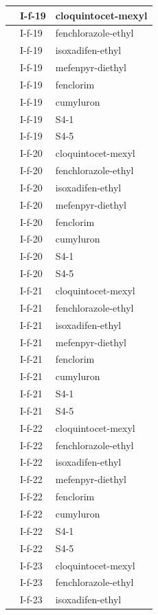\documentclass[11pt,a4paper]{article}
\begin{document}
\begin{table}[h]
\begin{tabular}{|l|l|l|}
 & I-f-19 & cloquintocet-mexyl \\ \hline
 & I-f-19 & fenchlorazole-ethyl \\ \hline
 & I-f-19 & isoxadifen-ethyl \\ \hline
 & I-f-19 & mefenpyr-diethyl \\ \hline
 & I-f-19 & fenclorim \\ \hline
 & I-f-19 & cumyluron \\ \hline
 & I-f-19 & S4-1 \\ \hline
 & I-f-19 & S4-5 \\ \hline
 & I-f-20 & cloquintocet-mexyl \\ \hline
 & I-f-20 & fenchlorazole-ethyl \\ \hline
 & I-f-20 & isoxadifen-ethyl \\ \hline
 & I-f-20 & mefenpyr-diethyl \\ \hline
 & I-f-20 & fenclorim \\ \hline
 & I-f-20 & cumyluron \\ \hline
 & I-f-20 & S4-1 \\ \hline
 & I-f-20 & S4-5 \\ \hline
 & I-f-21 & cloquintocet-mexyl \\ \hline
 & I-f-21 & fenchlorazole-ethyl \\ \hline
 & I-f-21 & isoxadifen-ethyl \\ \hline
 & I-f-21 & mefenpyr-diethyl \\ \hline
 & I-f-21 & fenclorim \\ \hline
 & I-f-21 & cumyluron \\ \hline
 & I-f-21 & S4-1 \\ \hline
 & I-f-21 & S4-5 \\ \hline
 & I-f-22 & cloquintocet-mexyl \\ \hline
 & I-f-22 & fenchlorazole-ethyl \\ \hline
 & I-f-22 & isoxadifen-ethyl \\ \hline
 & I-f-22 & mefenpyr-diethyl \\ \hline
 & I-f-22 & fenclorim \\ \hline
 & I-f-22 & cumyluron \\ \hline
 & I-f-22 & S4-1 \\ \hline
 & I-f-22 & S4-5 \\ \hline
 & I-f-23 & cloquintocet-mexyl \\ \hline
 & I-f-23 & fenchlorazole-ethyl \\ \hline
 & I-f-23 & isoxadifen-ethyl \\ \hline

\end{tabular}
\end{table}
\end{document}
